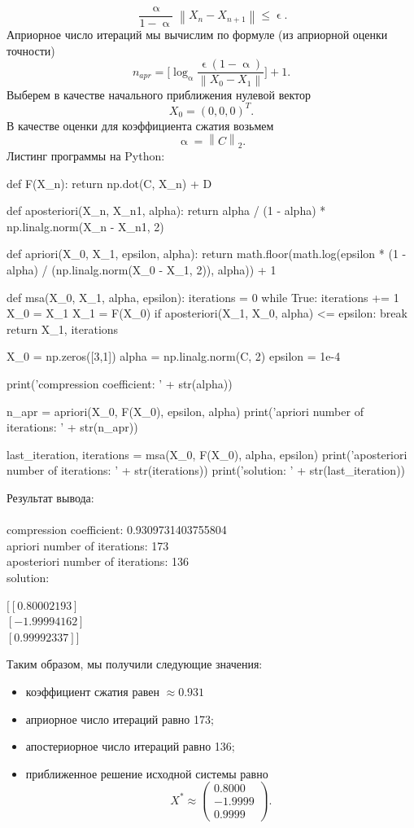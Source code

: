 \documentclass[a4paper, 12pt]{report}
\newcommand\Norm[1]{\left\| #1 \right\|}
\renewcommand{\leq}{\leqslant}
\renewcommand{\alpha}{\upalpha}
\renewcommand{\epsilon}{\upvarepsilon}
\begin{document}
	$$\dfrac{\alpha}{1 - \alpha}\Norm{X_n - X_{n+1}} \leq \epsilon.$$ 
	Априорное число итераций мы вычислим по формуле (из априорной оценки точности) $$n_{apr} = \Big[\log_\alpha \dfrac{\epsilon(1-\alpha)}{\Norm{X_0 - X_1}}\Big] + 1.$$
	Выберем в качестве начального приближения нулевой вектор $$X_0 = (0,0,0)^T.$$
	В качестве оценки для коэффициента сжатия возьмем $$\alpha = \Norm{C}_2.$$
	Листинг программы на Python:
	\begin{python}
		def F(X_n):
			return np.dot(C, X_n) + D
		
		def aposteriori(X_n, X_n1, alpha):
			return alpha / (1 - alpha) * np.linalg.norm(X_n - X_n1, 2)
		
		def apriori(X_0, X_1, epsilon, alpha):
			return math.floor(math.log(epsilon * (1 - alpha) / (np.linalg.norm(X_0 - X_1, 2)), alpha)) + 1
		
		def msa(X_0, X_1, alpha, epsilon):
			iterations = 0
			while True:
				iterations += 1
				X_0 = X_1
				X_1 = F(X_0)
					if aposteriori(X_1, X_0, alpha) <= epsilon:
						break
			return X_1, iterations
		
		X_0 = np.zeros([3,1])
		alpha = np.linalg.norm(C, 2)
		epsilon = 1e-4
		
		print('compression coefficient: ' + str(alpha))
		
		n_apr = apriori(X_0, F(X_0), epsilon, alpha)
		print('apriori number of iterations: ' + str(n_apr))
		
		last_iteration, iterations = msa(X_0, F(X_0), alpha, epsilon)
		print('aposteriori number of iterations: ' + str(iterations))
		print('solution: \n' + str(last_iteration))\end{python}
		Результат вывода:\\\\
		compression coefficient: 0.9309731403755804\\
		apriori number of iterations: 173\\
		aposteriori number of iterations: 136\\
		solution: 
		\begin{center}
			$[[ 0.80002193]$\\
			$[-1.99994162]$\\
			$[ 0.99992337]]$
		\end{center}
		Таким образом, мы получили следующие значения:\begin{itemize}
			\item коэффициент сжатия равен $\approx 0.931$
			\item априорное число итераций равно 173;
			\item апостериорное число итераций равно 136;
			\item приближенное решение исходной системы равно $$X^* \approx \begin{pmatrix}
			0.8000\\
			-1.9999\\
			0.9999
			\end{pmatrix}.$$ 
		\end{itemize}
\end{document}
